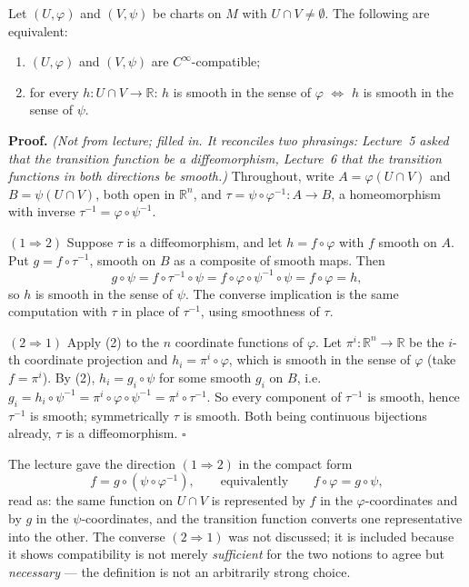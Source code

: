 \documentclass[11pt]{report}
\makeatletter
\newcounter{thmcounter}[section]
\renewenvironment{proof}[1][Proof]{\noindent\textbf{#1.} }{\hfill$\square$\par\vspace{5pt}}
\newcommand{\thmlabel}[1]{\edef\@currentlabel{\arabic{section}.\arabic{thmcounter}}\label{#1}}
\makeatother
\begin{document}
\begin{thmbox}\thmlabel{thm:compat-agree}
Let $(U,\varphi)$ and $(V,\psi)$ be charts on $M$ with $U \cap V \neq \emptyset$. The following are equivalent:
\begin{enumerate}
    \item $(U,\varphi)$ and $(V,\psi)$ are $C^\infty$-compatible;
    \item for every $h : U \cap V \to \mathbb{R}$: $h$ is smooth in the sense of $\varphi$ $\iff$ $h$ is smooth in the sense of $\psi$.
\end{enumerate}
\end{thmbox}

\begin{proof}
\textit{(Not from lecture; filled in. It reconciles two phrasings: Lecture~5 asked that the transition function be a diffeomorphism, Lecture~6 that the transition functions in both directions be smooth.)} Throughout, write $A = \varphi(U \cap V)$ and $B = \psi(U \cap V)$, both open in $\mathbb{R}^n$, and $\tau = \psi \circ \varphi^{-1} : A \to B$, a homeomorphism with inverse $\tau^{-1} = \varphi \circ \psi^{-1}$.

$(1 \Rightarrow 2)$ Suppose $\tau$ is a diffeomorphism, and let $h = f \circ \varphi$ with $f$ smooth on $A$. Put $g = f \circ \tau^{-1}$, smooth on $B$ as a composite of smooth maps. Then
\[
g \circ \psi = f \circ \tau^{-1} \circ \psi = f \circ \varphi \circ \psi^{-1} \circ \psi = f \circ \varphi = h,
\]
so $h$ is smooth in the sense of $\psi$. The converse implication is the same computation with $\tau$ in place of $\tau^{-1}$, using smoothness of $\tau$.

$(2 \Rightarrow 1)$ Apply (2) to the $n$ coordinate functions of $\varphi$. Let $\pi^i : \mathbb{R}^n \to \mathbb{R}$ be the $i$-th coordinate projection and $h_i = \pi^i \circ \varphi$, which is smooth in the sense of $\varphi$ (take $f = \pi^i$). By (2), $h_i = g_i \circ \psi$ for some smooth $g_i$ on $B$, i.e.\ $g_i = h_i \circ \psi^{-1} = \pi^i \circ \varphi \circ \psi^{-1} = \pi^i \circ \tau^{-1}$. So every component of $\tau^{-1}$ is smooth, hence $\tau^{-1}$ is smooth; symmetrically $\tau$ is smooth. Both being continuous bijections already, $\tau$ is a diffeomorphism.
\end{proof}

\begin{rembox}\label{rem:board-version}
The lecture gave the direction $(1 \Rightarrow 2)$ in the compact form
\[
f = g \circ (\psi \circ \varphi^{-1}), \qquad \text{equivalently} \qquad f \circ \varphi = g \circ \psi,
\]
read as: the same function on $U \cap V$ is represented by $f$ in the $\varphi$-coordinates and by $g$ in the $\psi$-coordinates, and the transition function converts one representative into the other. The converse $(2 \Rightarrow 1)$ was not discussed; it is included because it shows compatibility is not merely \emph{sufficient} for the two notions to agree but \emph{necessary} --- the definition is not an arbitrarily strong choice.
\end{rembox}
\end{document}
